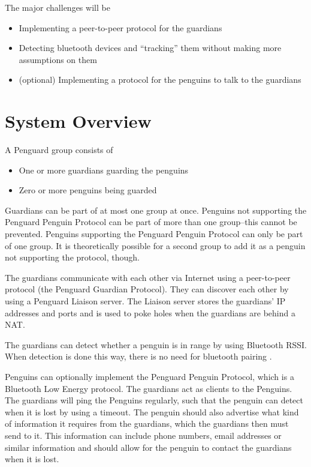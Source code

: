 \documentclass{report}
\begin{document}
The major challenges will be

\begin{itemize}
    \item Implementing a peer-to-peer protocol for the guardians
    \item Detecting bluetooth devices and ``tracking'' them without making more assumptions on them
    \item (optional) Implementing a protocol for the penguins to talk to the guardians
\end{itemize}

\section{System Overview}

A Penguard group consists of

\begin{itemize}
    \item One or more guardians guarding the penguins
    \item Zero or more penguins being guarded
\end{itemize}

Guardians can be part of at most one group at once. Penguins not supporting the Penguard Penguin Protocol can be part of more than one group--this cannot be prevented. Penguins supporting the Penguard Penguin Protocol can only be part of one group. It is theoretically possible for a second group to add it as a penguin not supporting the protocol, though.

The guardians communicate with each other via Internet using a peer-to-peer protocol (the Penguard Guardian Protocol). They can discover each other by using a Penguard Liaison server. The Liaison server stores the guardians' IP addresses and ports and is used to poke holes when the guardians are behind a NAT.

The guardians can detect whether a penguin is in range by using Bluetooth RSSI. When detection is done this way, there is no need for bluetooth pairing \cite{raspi_RSSI}.

Penguins can optionally implement the Penguard Penguin Protocol, which is a Bluetooth Low Energy protocol. The guardians act as clients to the Penguins. The guardians will ping the Penguins regularly, such that the penguin can detect when it is lost by using a timeout. The penguin should also advertise what kind of information it requires from the guardians, which the guardians then must send to it. This information can include phone numbers, email addresses or similar information and should allow for the penguin to contact the guardians when it is lost.
\end{document}
